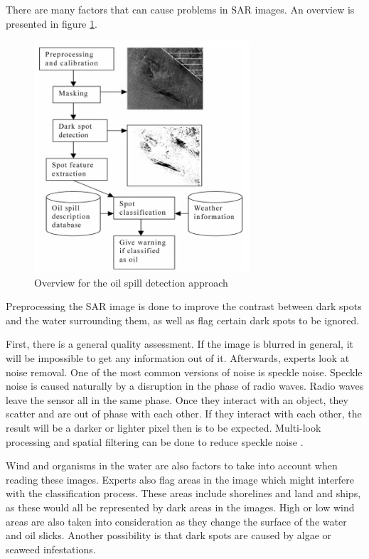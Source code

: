 There are many factors that can cause problems in SAR images. An overview is presented in figure \ref{fig:overview}.
\begin{figure}[H]
    \includegraphics[width=80mm]{./img/detection_diagram.png}
    \caption{Overview for the oil spill detection approach \cite{Solberg200745}}
    \label{fig:overview}
\end{figure}
Preprocessing the SAR image is done to improve the contrast between dark spots and the water surrounding them, as well as flag certain dark spots to be ignored. 

First, there is a general quality assessment. If the image is blurred in general, it will be impossible to get any information out of it. Afterwards, experts look at noise removal. One of the most common versions of noise is speckle noise. Speckle noise is caused naturally by a disruption in the phase of radio waves. Radio waves leave the sensor all in the same phase. Once they interact with an object, they scatter and are out of phase with each other. If they interact with each other, the result will be a darker or lighter pixel then is to be expected. Multi-look processing and spatial filtering can be done to reduce speckle noise \cite{simard1998analysis}.

Wind and organisms in the water are also factors to take into account when reading these images. Experts also flag areas in the image which might interfere with the classification process. These areas include shorelines and land and ships, as these would all be represented by dark areas in the images.
High or low wind areas are also taken into consideration as they change the surface of the water and oil slicks. Another possibility is that dark spots are caused by algae or seaweed infestations\cite{fingas2014review}.


